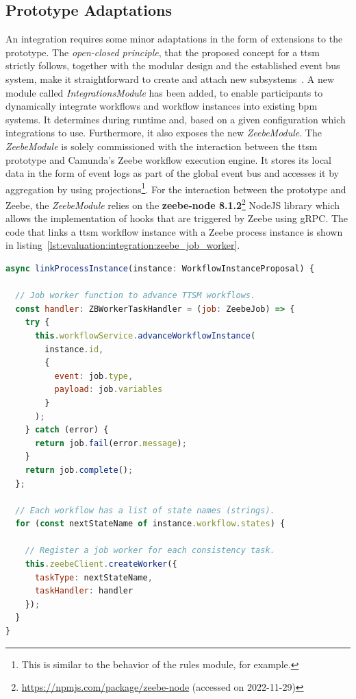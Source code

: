 \subsection{Prototype Adaptations}
\label{sec:evaluation:integration:adaptations}
An integration requires some minor adaptations in the form of extensions to the prototype. The \textit{open-closed principle}, that the proposed concept for a \gls{ttsm} strictly follows, together with the modular design and the established event bus system, make it straightforward to create and attach new subsystems~\cite{meyer97_oo_software_construction,martin96_open_closed_principle,geirhos2015_design_patterns}. A new module called \textit{IntegrationsModule} has been added, to enable participants to dynamically integrate workflows and workflow instances into existing \gls{bpm} systems. It determines during runtime and, based on a given configuration which integrations to use. Furthermore, it also exposes the new \textit{ZeebeModule}. The \textit{ZeebeModule} is solely commissioned with the interaction between the \gls{ttsm} prototype and Camunda's Zeebe workflow execution engine. It stores its local data in the form of event logs as part of the global event bus and accesses it by aggregation by using projections\footnote{This is similar to the behavior of the rules module, for example.}. For the interaction between the prototype and Zeebe, the \textit{ZeebeModule} relies on the \textbf{zeebe-node 8.1.2}\footnote{\url{https://npmjs.com/package/zeebe-node} (accessed on 2022-11-29)} NodeJS library which allows the implementation of hooks that are triggered by Zeebe using gRPC\@. The code that links a \gls{ttsm} workflow instance with a Zeebe process instance is shown in listing~\ref{lst:evaluation:integration:zeebe_job_worker}.\\

\begin{lstlisting}[language=JavaScript,caption=Implementation of dynamic Zeebe job worker registration,captionpos=b,label=lst:evaluation:integration:zeebe_job_worker]
async linkProcessInstance(instance: WorkflowInstanceProposal) {

  // Job worker function to advance TTSM workflows.
  const handler: ZBWorkerTaskHandler = (job: ZeebeJob) => {
    try {
      this.workflowService.advanceWorkflowInstance(
        instance.id,
        {
          event: job.type,
          payload: job.variables
        }
      );
    } catch (error) {
      return job.fail(error.message);
    }
    return job.complete();
  };

  // Each workflow has a list of state names (strings).
  for (const nextStateName of instance.workflow.states) {

    // Register a job worker for each consistency task.
    this.zeebeClient.createWorker({
      taskType: nextStateName,
      taskHandler: handler
    });
  }
}
\end{lstlisting}

